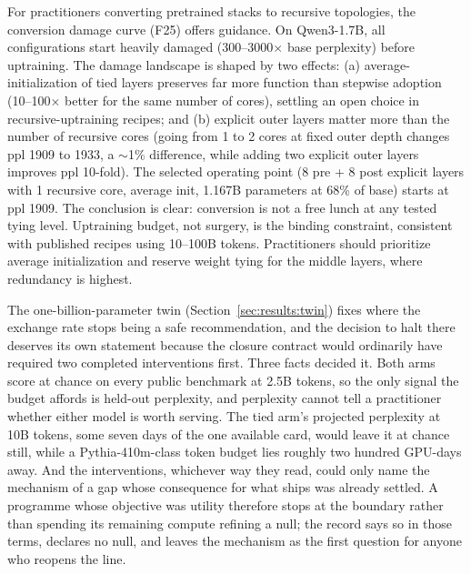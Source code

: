 For practitioners converting pretrained stacks to recursive topologies, the conversion damage curve (F25) offers guidance. On Qwen3-1.7B, all configurations start heavily damaged (300--3000$\times$ base perplexity) before uptraining. The damage landscape is shaped by two effects: (a) average-initialization of tied layers preserves far more function than stepwise adoption (10--100$\times$ better for the same number of cores), settling an open choice in recursive-uptraining recipes; and (b) explicit outer layers matter more than the number of recursive cores (going from 1 to 2 cores at fixed outer depth changes ppl 1909 to 1933, a $\sim$1\% difference, while adding two explicit outer layers improves ppl 10-fold). The selected operating point (8 pre + 8 post explicit layers with 1 recursive core, average init, 1.167B parameters at 68\% of base) starts at ppl 1909. The conclusion is clear: conversion is not a free lunch at any tested tying level. Uptraining budget, not surgery, is the binding constraint, consistent with published recipes using 10--100B tokens. Practitioners should prioritize average initialization and reserve weight tying for the middle layers, where redundancy is highest.

The one-billion-parameter twin (Section~\ref{sec:results:twin}) fixes where the exchange rate stops being a safe recommendation, and the decision to halt there deserves its own statement because the closure contract would ordinarily have required two completed interventions first. Three facts decided it. Both arms score at chance on every public benchmark at 2.5B tokens, so the only signal the budget affords is held-out perplexity, and perplexity cannot tell a practitioner whether either model is worth serving. The tied arm's projected perplexity at 10B tokens, some seven days of the one available card, would leave it at chance still, while a Pythia-410m-class token budget lies roughly two hundred GPU-days away. And the interventions, whichever way they read, could only name the mechanism of a gap whose consequence for what ships was already settled. A programme whose objective was utility therefore stops at the boundary rather than spending its remaining compute refining a null; the record says so in those terms, declares no null, and leaves the mechanism as the first question for anyone who reopens the line.

